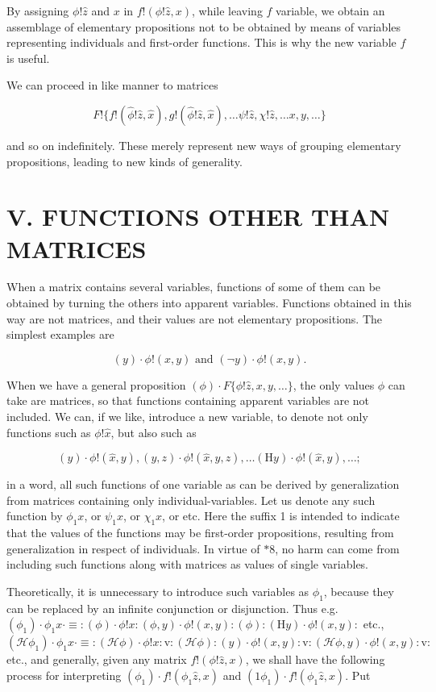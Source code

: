 \documentclass[10pt]{article}
\begin{document}
By assigning $\phi!\hat{z}$ and $x$ in $f!(\phi!\hat{z}, x)$, while leaving $f$ variable, we obtain an assemblage of elementary propositions not to be obtained by means of variables representing individuals and first-order functions. This is why the new variable $f$ is useful.

We can proceed in like manner to matrices

$$
F!\{f!(\hat{\phi}!\hat{z}, \hat{x}), g!(\hat{\phi}!\hat{z}, \hat{x}), \ldots \psi!\hat{z}, \chi!\hat{z}, \ldots x, y, \ldots\}
$$

and so on indefinitely. These merely represent new ways of grouping elementary propositions, leading to new kinds of generality.

\section*{V. FUNCTIONS OTHER THAN MATRICES}
When a matrix contains several variables, functions of some of them can be obtained by turning the others into apparent variables. Functions obtained in this way are not matrices, and their values are not elementary propositions. The simplest examples are

$$
(y) \cdot \phi!(x, y) \text { and }(\neg y) \cdot \phi!(x, y) .
$$

When we have a general proposition $(\phi) \cdot F\{\phi!\hat{z}, x, y, \ldots\}$, the only values $\phi$ can take are matrices, so that functions containing apparent variables are not included. We can, if we like, introduce a new variable, to denote not only functions such as $\phi!\hat{x}$, but also such as

$$
(y) \cdot \phi!(\hat{x}, y),(y, z) \cdot \phi!(\hat{x}, y, z), \ldots(\mathrm{H} y) \cdot \phi!(\hat{x}, y), \ldots ;
$$

in a word, all such functions of one variable as can be derived by generalization from matrices containing only individual-variables. Let us denote any such function by $\phi_{1} x$, or $\psi_{1} x$, or $\chi_{1} x$, or etc. Here the suffix 1 is intended to indicate that the values of the functions may be first-order propositions, resulting from generalization in respect of individuals. In virtue of $* 8$, no harm can come from including such functions along with matrices as values of single variables.

Theoretically, it is unnecessary to introduce such variables as $\phi_{1}$, because they can be replaced by an infinite conjunction or disjunction. Thus e.g.\\
$\left(\phi_{1}\right) \cdot \phi_{1} x \cdot \equiv:(\phi) \cdot \phi!x:(\phi, y) \cdot \phi!(x, y):(\phi):(\mathrm{H} y) \cdot \phi!(x, y):$ etc., $\left(\mathcal{H} \phi_{1}\right) \cdot \phi_{1} x \cdot \equiv:(\mathcal{H} \phi) \cdot \phi!x: \mathrm{v}:(\mathcal{H} \phi):(y) \cdot \phi!(x, y): \mathrm{v}:(\mathcal{H} \phi, y) \cdot \phi!(x, y): \mathrm{v}:$ etc., and generally, given any matrix $f!(\phi!\hat{z}, x)$, we shall have the following process for interpreting $\left(\phi_{1}\right) \cdot f!\left(\phi_{1} \hat{z}, x\right)$ and $\left(1 \phi_{1}\right) \cdot f!\left(\phi_{1} \hat{z}, x\right)$. Put
\end{document}

